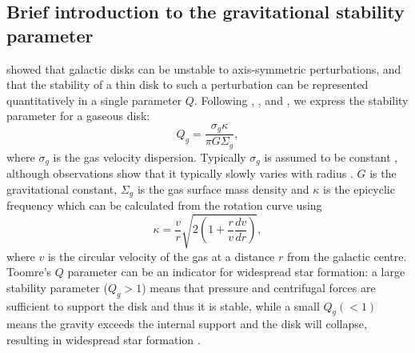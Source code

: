 \documentclass[12pt,preprint]{aastex}
\begin{document}
\subsection{Brief introduction to the gravitational stability parameter}
\label{threshold}
\citet{too64} showed that galactic disks can be unstable to axis-symmetric perturbations, and that the stability of a thin disk to such a perturbation can be represented quantitatively in a single parameter $Q$. Following \citet{too64}, \citet{wan94}, and \citet{raf01}, we express the stability parameter for a gaseous disk:
\begin{equation}
Q_{g}=\frac{\sigma_g \kappa}{\pi G \Sigma_g}, 
\label{Qg}
\end{equation}
where $\sigma_g$ is the gas velocity dispersion. Typically $\sigma_g$ is assumed to be constant \citep[e.g.][hereafter L08]{ler08}, although observations show that it typically slowly varies with radius \citep[e.g.][] {tam09,obr10}.
 $G$ is the gravitational constant, $\Sigma_g$ is the gas surface mass density and $\kappa$ is the epicyclic frequency which can be calculated from the rotation curve using
\begin{equation}
\kappa=\frac{v}{r}\sqrt{2\left(1+\frac{r}{v} \frac{dv}{dr}\right)},
\label{e:kappa}
\end{equation}
where $v$ is the circular velocity of the gas at a distance $r$ from the galactic centre.  Toomre's $Q$  parameter can be an indicator for 
widespread star formation: a large stability parameter ($Q_g>1$) means that pressure and centrifugal forces are sufficient to support the disk and thus it is stable, while a small $Q_g(<1)$ means the gravity exceeds the internal support and the disk will collapse, resulting in widespread star formation \citep{ken89,vdh93,mar01}.
\end{document}
